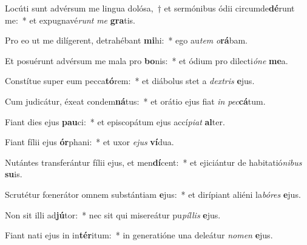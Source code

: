 \item Locúti sunt advérsum me lingua dolósa,~† et sermónibus ódii circumde\textbf{dé}runt me:~* et expugnavé\textit{runt} \textit{me} \textbf{gra}tis.
\item Pro eo ut me dilígerent, detrahébant \textbf{mi}hi:~* ego au\textit{tem} \textit{o}\textbf{rá}bam.
\item Et posuérunt advérsum me mala pro \textbf{bo}nis:~* et ódium pro dilecti\textit{ó}\textit{ne} \textbf{me}a.
\item Constítue super eum pecca\textbf{tó}rem:~* et diábolus stet a \textit{dex}\textit{tris} \textbf{e}jus.
\item Cum judicátur, éxeat condem\textbf{ná}tus:~* et orátio ejus fiat \textit{in} \textit{pec}\textbf{cá}tum.
\item Fiant dies ejus \textbf{pau}ci:~* et episcopátum ejus accí\textit{pi}\textit{at} \textbf{al}ter.
\item Fiant fílii ejus \textbf{ór}phani:~* et uxor \textit{e}\textit{jus} \textbf{ví}dua.
\item Nutántes transferántur fílii ejus, et men\textbf{dí}cent:~* et ejiciántur de habitatió\textit{ni}\textit{bus} \textbf{su}is.
\item Scrutétur fœnerátor omnem substántiam \textbf{e}jus:~* et dirípiant aliéni la\textit{bó}\textit{res} \textbf{e}jus.
\item Non sit illi ad\textbf{jú}tor:~* nec sit qui misereátur pu\textit{píl}\textit{lis} \textbf{e}jus.
\item Fiant nati ejus in in\textbf{tér}itum:~* in generatióne una deleátur \textit{no}\textit{men} \textbf{e}jus.
